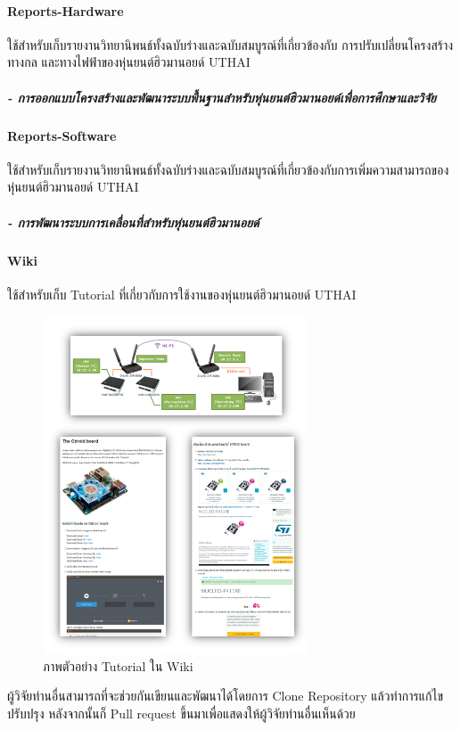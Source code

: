\paragraph*{Reports-Hardware}
ใช้สำหรับเก็บรายงานวิทยานิพนธ์ทั้งฉบับร่างและฉบับสมบูรณ์ที่เกี่ยวข้องกับ การปรับเปลี่ยนโครงสร้างทางกล และทางไฟฟ้าของหุ่นยนต์ฮิวมานอยด์ UTHAI
\subparagraph*{- การออกแบบโครงสร้างและพัฒนาระบบพื้นฐานสำหรับหุ่นยนต์ฮิวมานอยด์เพื่อการศึกษาและวิจัย}

\paragraph*{Reports-Software}
ใช้สำหรับเก็บรายงานวิทยานิพนธ์ทั้งฉบับร่างและฉบับสมบูรณ์ที่เกี่ยวข้องกับการเพิ่มความสามารถของหุ่นยนต์ฮิวมานอยด์ UTHAI
\subparagraph*{- การพัฒนาระบบการเคลื่อนที่สำหรับหุ่นยนต์ฮิวมานอยด์}

\paragraph*{Wiki}
ใช้สำหรับเก็บ Tutorial ที่เกี่ยวกับการใช้งานของหุ่นยนต์ฮิวมานอยด์ UTHAI

\begin{figure}[!ht]
	\centering
	\includegraphics[width=0.7\textwidth]{chapter4/images/uthai_platform/uthai_doc.png}
	\caption{ภาพตัวอย่าง Tutorial ใน Wiki}
\end{figure}

ผู้วิจัยท่านอื่นสามารถที่จะช่วยกันเขียนและพัฒนาได้โดยการ Clone Repository แล้วทำการแก้ไขปรับปรุง หลังจากนั้นก็ Pull request ขึ้นมาเพื่อแสดงให้ผู้วิจัยท่านอื่นเห็นด้วย



